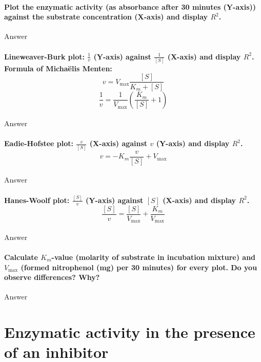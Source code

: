 \documentclass[a4paper,12pt]{article}
\begin{document}
\paragraph{Plot the enzymatic activity (as absorbance after 30 minutes (Y-axis)) 
against the substrate concentration (X-axis) and display $R^2$.}

Answer\\

\paragraph{Lineweaver-Burk plot: $\frac{1}{v}$ (Y-axis) against $\frac{1}{[S]}$ (X-axis) and display $R^2$. 
Formula of Michaëlis Menten:\[v=V_{\text{max}}\frac{[S]}{K_m+[S]}\] \[\frac{1}{v}=\frac{1}{V_{\text{max}}}\left(\frac{K_m}{[S]}+1\right)\]}

Answer\\

\paragraph{Eadie-Hofstee plot: $\frac{v}{[S]}$ (X-axis) against $v$ (Y-axis) and display $R^2$. \[v=-K_m\frac{v}{[S]}+V_{\text{max}}\]}

Answer\\

\paragraph{Hanes-Woolf plot: $\frac{[S]}{v}$ (Y-axis) against $[S]$ (X-axis) and display $R^2$. \[\frac{[S]}{v}=\frac{[S]}{V_{\text{max}}}+\frac{K_m}{V_{\text{max}}}\]}

Answer\\

\paragraph{Calculate $K_m$-value (molarity of substrate in incubation mixture) and $V_{\text{max}}$ (formed nitrophenol (mg) per 30 minutes) for every plot. Do you observe 
differences? Why? 
}

Answer\\

\section{Enzymatic activity in the presence of an inhibitor}
\end{document}
